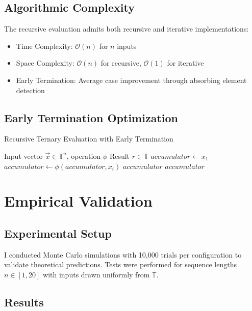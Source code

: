 \documentclass[11pt,a4paper]{article}
\begin{document}
\subsection{Algorithmic Complexity}

The recursive evaluation admits both recursive and iterative implementations:

\begin{itemize}
\item Time Complexity: $\mathcal{O}(n)$ for $n$ inputs
\item Space Complexity: $\mathcal{O}(n)$ for recursive, $\mathcal{O}(1)$ for iterative
\item Early Termination: Average case improvement through absorbing element detection
\end{itemize}

\subsection{Early Termination Optimization}

\begin{algorithm}
\caption{Recursive Ternary Evaluation with Early Termination}
\begin{algorithmic}[1]
\REQUIRE Input vector $\vec{x} \in \mathbb{T}^n$, operation $\phi$
\ENSURE Result $r \in \mathbb{T}$
\STATE $accumulator \leftarrow x_1$
    \STATE $accumulator \leftarrow \phi(accumulator, x_i)$
        \RETURN $accumulator$ 
    \ENDIF
\ENDFOR
\RETURN $accumulator$
\end{algorithmic}
\end{algorithm}

\section{Empirical Validation}

\subsection{Experimental Setup}

I conducted Monte Carlo simulations with 10,000 trials per configuration to validate theoretical predictions. Tests were performed for sequence lengths $n \in [1, 20]$ with inputs drawn uniformly from $\mathbb{T}$.

\subsection{Results}
\end{document}
